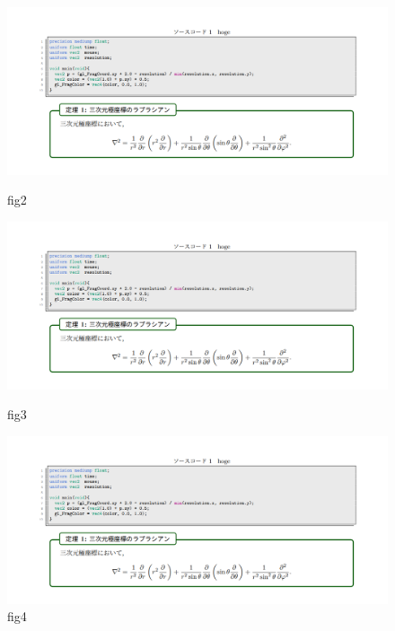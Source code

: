 \documentclass[uplatex,dvipdfmx,ja=standard,a4paper]{bxjsarticle}
\begin{document}
\begin{figure}[h]
  \centering
  \begin{minipage}[t]{0.24\columnwidth}
    \centering
    \includegraphics[keepaspectratio, width=\columnwidth,clip]{hoge.png}
    \caption{fig2}
    \label{fig:2}
  \end{minipage}
  \begin{minipage}[t]{0.24\columnwidth}
    \centering
    \includegraphics[keepaspectratio, width=\columnwidth,clip]{hoge.png}
    \caption{fig3}
    \label{fig:3}
  \end{minipage}
  \begin{minipage}[t]{0.24\columnwidth}
    \centering
    \includegraphics[keepaspectratio, width=\columnwidth,clip]{hoge.png}
    \caption{fig4}
    \label{fig:4}
  \end{minipage}
  \begin{minipage}[t]{0.24\columnwidth}

\end{minipage}
\end{figure}
\end{document}

